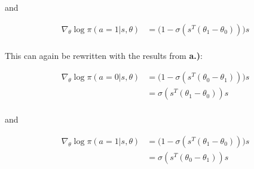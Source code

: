 \documentclass[11pt,a4paper]{article}
\begin{document}
and 

\begin{align*}
  \nabla_{\theta} \log \pi(a=1|s,\theta) &=  \bigl( 1 -  \sigma(s^{T}(\theta_{1} - \theta_{0})) \bigr)s \\
\end{align*}

This can again be rewritten with the results from \textbf{a.)}:


\begin{align*}
  \nabla_{\theta} \log \pi(a=0|s,\theta) &=  \bigl( 1 -  \sigma(s^{T}(\theta_{0} - \theta_{1})) \bigr)s \\
                                         &= \sigma(s^{T}(\theta_{1} - \theta_{0}))s \\
\end{align*}

and

\begin{align*}
  \nabla_{\theta} \log \pi(a=1|s,\theta) &=  \bigl( 1 -  \sigma(s^{T}(\theta_{1} - \theta_{0})) \bigr)s \\
                                         &= \sigma(s^{T}(\theta_{0} - \theta_{1}))s \\
\end{align*}
\end{document}
